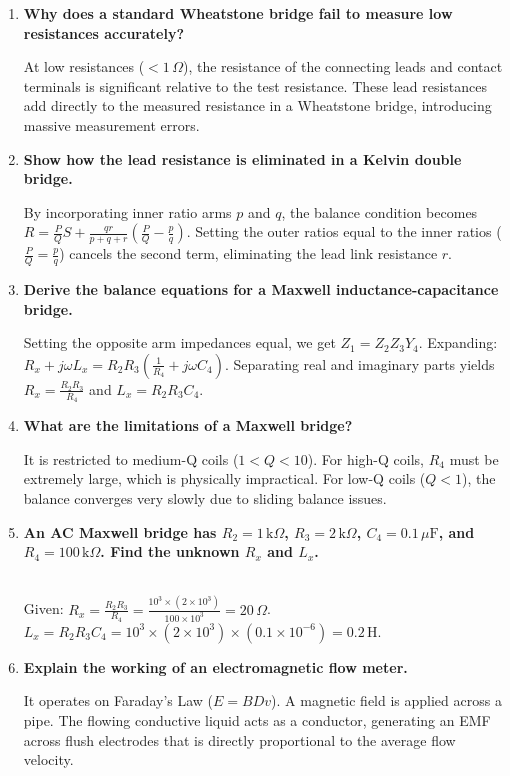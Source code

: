 \documentclass[12pt,a4paper]{article}
\newcommand{\Q}[1]{\textbf{#1}\par\noindent\ignorespaces}
\begin{document}
\begin{tcolorbox}[exambox, title={\textbf{Frequently Asked / Viva Questions}}]
\begin{enumerate}[topsep=0pt, label=\textbf{Q\arabic*.}, itemsep=5pt]
  \item \Q{Why does a standard Wheatstone bridge fail to measure low resistances accurately?}
    At low resistances ($< 1\,\Omega$), the resistance of the connecting leads and contact terminals is significant relative to the test resistance. These lead resistances add directly to the measured resistance in a Wheatstone bridge, introducing massive measurement errors.
  \item \Q{Show how the lead resistance is eliminated in a Kelvin double bridge.}
    By incorporating inner ratio arms $p$ and $q$, the balance condition becomes $R = \frac{P}{Q} S + \frac{q r}{p + q + r}(\frac{P}{Q} - \frac{p}{q})$. Setting the outer ratios equal to the inner ratios ($\frac{P}{Q} = \frac{p}{q}$) cancels the second term, eliminating the lead link resistance $r$.
  \item \Q{Derive the balance equations for a Maxwell inductance-capacitance bridge.}
    Setting the opposite arm impedances equal, we get $Z_1 = Z_2 Z_3 Y_4$. Expanding: $R_x + j\omega L_x = R_2 R_3 (\frac{1}{R_4} + j\omega C_4)$. Separating real and imaginary parts yields $R_x = \frac{R_2 R_3}{R_4}$ and $L_x = R_2 R_3 C_4$.
  \item \Q{What are the limitations of a Maxwell bridge?}
    It is restricted to medium-Q coils ($1 < Q < 10$). For high-Q coils, $R_4$ must be extremely large, which is physically impractical. For low-Q coils ($Q < 1$), the balance converges very slowly due to sliding balance issues.
  \item \Q{An AC Maxwell bridge has $R_2 = 1\,\text{k}\Omega$, $R_3 = 2\,\text{k}\Omega$, $C_4 = 0.1\,\mu\text{F}$, and $R_4 = 100\,\text{k}\Omega$. Find the unknown $R_x$ and $L_x$.}\\
    Given: $R_x = \frac{R_2 R_3}{R_4} = \frac{10^3 \times (2 \times 10^3)}{100 \times 10^3} = 20\,\Omega$.\\
    $L_x = R_2 R_3 C_4 = 10^3 \times (2 \times 10^3) \times (0.1 \times 10^{-6}) = 0.2\,\text{H}$.
  \item \Q{Explain the working of an electromagnetic flow meter.}
    It operates on Faraday's Law ($E = B D v$). A magnetic field is applied across a pipe. The flowing conductive liquid acts as a conductor, generating an EMF across flush electrodes that is directly proportional to the average flow velocity.

\end{enumerate}
\end{tcolorbox}
\end{document}
